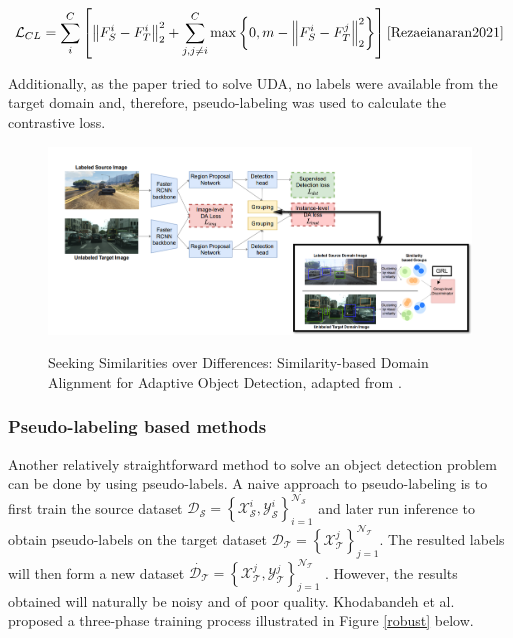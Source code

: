 \begin{equation}
\mathcal{L}_{C L}=\sum_{i}^{C}\left[\left\|F_{S}^{i}-F_{T}^{i}\right\|_{2}^{2}+\sum_{j, j \neq i}^{C} \max \left\{0, m-\left\|F_{S}^{i}-F_{T}^{j}\right\|_{2}^{2}\right\}\right]
\label{contrastiveL} 
\cite{Rezaeianaran2021} 
\end{equation}

Additionally, as the paper tried to solve UDA, no labels were available from the target domain and, therefore, pseudo-labeling was used to calculate the contrastive loss.  


\begin{figure}[htb]
	\begin{center}
		\includegraphics[width=16cm]{./VisGa.png}
	\end{center}
	\caption{Seeking Similarities over Differences: Similarity-based Domain Alignment for Adaptive Object Detection, adapted from \cite{Rezaeianaran2021}.}
	\begin{center}
		\label{visga}
	\end{center}
\end{figure}
\FloatBarrier


\subsubsection{Pseudo-labeling based methods}

Another relatively straightforward method to solve an object detection problem can be done by using pseudo-labels. A naive approach to pseudo-labeling is to first train the source dataset $\mathcal{D}_{\mathcal{S}}=\left\{\mathcal{X}_{\mathcal{S}}^{i}, \mathcal{Y}_{\mathcal{S}}^{i}\right\}_{i=1}^{\mathcal{N}_{\mathcal{S}}}$ and later run inference to obtain pseudo-labels on the target dataset $\mathcal{D}_{\mathcal{T}}=\left\{\mathcal{X}_{\mathcal{T}}^{j}\right\}_{j=1}^{\mathcal{N}_{\mathcal{T}}}$. The resulted labels will then form a new dataset $\dot{\mathcal{D}_{\mathcal{T}}}=\left\{\mathcal{X}_{\mathcal{T}}^{j}, \mathcal{Y}_{\mathcal{T}}^{j}\right\}_{j=1}^{\mathcal{N}_{\mathcal{T}}}$ \cite{Oza2021}. However, the results obtained will naturally be noisy and of poor quality. Khodabandeh et al. proposed a three-phase training process illustrated in Figure \ref{robust} below. 

